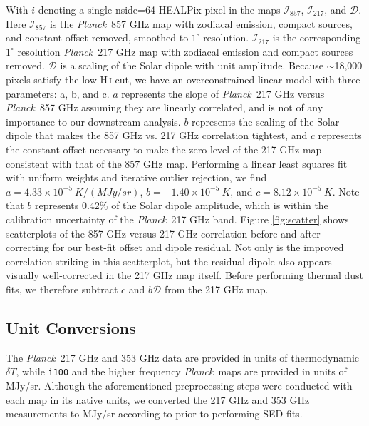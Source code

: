 \documentclass{emulateapj}
\newcommand{\PLANCK}{{\it Planck}}
\begin{document}
With $i$ denoting a single nside=64 HEALPix pixel in the maps 
$\mathcal{I}_{857}$, $\mathcal{I}_{217}$, and $\mathcal{D}$. Here 
$\mathcal{I}_{857}$ is the \PLANCK~857 GHz map with zodiacal emission, compact 
sources, and constant offset removed, smoothed to $1^{\circ}$ resolution. 
$\mathcal{I}_{217}$ is the corresponding $1^{\circ}$ resolution \PLANCK~217 
GHz map with zodiacal emission and compact sources removed. $\mathcal{D}$ is a
scaling of the Solar dipole with unit amplitude. Because $\sim$18,000 pixels
satisfy the low H\,\textsc{i} cut, we have an overconstrained linear model with
three parameters: a, b, and c. $a$ represents the slope of \PLANCK~217 GHz 
versus \PLANCK~857 GHz assuming they are linearly correlated, and is not
of any importance to our downstream analysis. $b$ represents the scaling of 
the Solar dipole that makes the 857 GHz vs. 217 GHz correlation tightest, and 
$c$ represents the constant offset necessary to make the zero level of the 217 
GHz map consistent with that of the 857 GHz map. Performing a linear least
squares fit with uniform weights and iterative outlier rejection, we find 
$a=4.33\times10^{-5}\ K/(MJy/sr)$, $b=-1.40\times10^{-5}\ K$, and 
$c=8.12\times10^{-5}\ K$. Note that $b$ represents 0.42\% of the Solar dipole 
amplitude, which is within the calibration uncertainty of the \PLANCK~217 GHz 
band. Figure \ref{fig:scatter} shows scatterplots of the 857 GHz versus 217 
GHz correlation before and after correcting for our best-fit offset and dipole 
residual. Not only is the improved correlation striking in this scatterplot, 
but the residual dipole also appears visually well-corrected in the 217 GHz 
map itself. Before performing thermal dust fits, we therefore subtract $c$ and 
$b\mathcal{D}$ from the 217 GHz map.

\subsection{Unit Conversions}

The \PLANCK~217 GHz and 353 GHz data are provided in units of thermodynamic 
$\delta T$, while \verb|i100| and the higher frequency \PLANCK~maps are 
provided in units of MJy/sr. Although the aforementioned preprocessing steps 
were conducted with each map in its native units, we converted the 217 GHz and 
353 GHz measurements to MJy/sr according to \cite{planckresponse} prior to 
performing SED fits.

\end{document}
